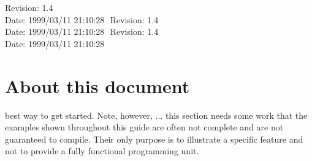 %
%
%
%
%
%
%
%
%
%
  {\LARGE $ $Revision: 1.4 $ $}  \\[5mm] %
  {\LARGE $ $Date: 1999/03/11 21:10:28 $ $}  %
%
%
%
%
  {\LARGE $ $Revision: 1.4 $ $}  \\[5mm] %
  {\LARGE $ $Date: 1999/03/11 21:10:28 $ $}  %
%
  {\LARGE $ $Revision: 1.4 $ $}  \\[5mm] %
  {\LARGE $ $Date: 1999/03/11 21:10:28 $ $}  %
%
\section{About this document}
best way to get started. Note, however,
... this section needs some work
that the examples shown throughout this guide are often not complete
and are not guaranteed to compile. Their only purpose is to illustrate
a specific feature and not to provide a fully functional programming unit.

